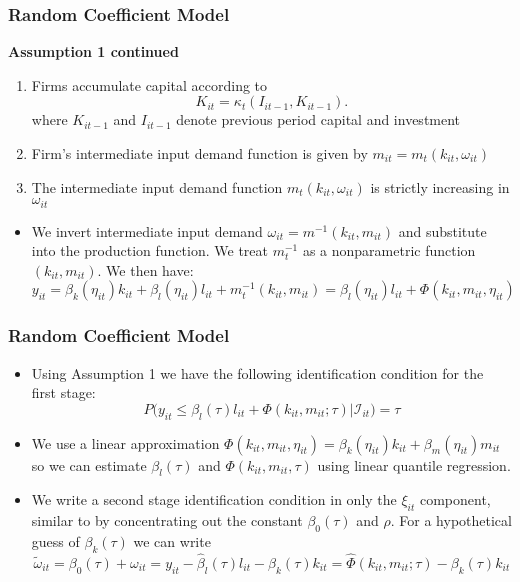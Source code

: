 \documentclass{beamer}
\begin{document}
\begin{frame}
\frametitle{Random Coefficient Model}
\textbf{Assumption 1 continued}
\begin{enumerate}
	\item Firms accumulate capital according to
	\begin{equation}
	    K_{it}=\kappa_{t}(I_{it-1}, K_{it-1}).
	\end{equation}
	where $K_{it-1}$ and $I_{it-1}$ denote previous period capital and investment
	\item Firm's intermediate input demand function is given by $m_{it}=m_{t}(k_{it}, \omega_{it})$
	\item The intermediate input demand function $m_{t}(k_{it}, \omega_{it})$ is strictly increasing in $\omega_{it}$
\end{enumerate}
\begin{itemize}
	\item We invert intermediate input demand $\omega_{it}=m^{-1}(k_{it}, m_{it})$ and substitute into the production function. We treat $m_{t}^{-1}$ as a nonparametric function $(k_{it}, m_{it})$. We then have:
	\begin{equation} \label{qpf1st}
		y_{it}=\beta_{k}(\eta_{it})k_{it}+\beta_{l}(\eta_{it})l_{it}+m_{t}^{-1}(k_{it}, m_{it})=\beta_{l}(\eta_{it})l_{it}+\Phi(k_{it}, m_{it}, \eta_{it})
	\end{equation}
\end{itemize}
\end{frame}


\begin{frame}
\frametitle{Random Coefficient Model}
\begin{itemize}
	\item Using Assumption 1 we have the following identification condition for the first stage:
		\begin{equation}
			P\big(y_{it}\leq \beta_{l}(\tau)l_{it}+\Phi(k_{it}, m_{it}; \tau)\big|\mathcal{I}_{it})=\tau
		\end{equation}
	\item We use a linear approximation $\Phi(k_{it}, m_{it}, \eta_{it})=\beta_{k}(\eta_{it})k_{it}+\beta_{m}(\eta_{it})m_{it}$ so we can estimate $\beta_{l}(\tau)$ and $\Phi(k_{it}, m_{it}, \tau)$ using linear quantile regression.
	\item We write a second stage identification condition in only the $\xi_{it}$ component, similar to \cite{Ackerberg2015} by concentrating out the constant $\beta_{0}(\tau)$ and $\rho$. For a hypothetical guess of $\beta_{k}(\tau)$ we can write
	\begin{equation}
		\tilde{\omega}_{it}=\beta_{0}(\tau)+\omega_{it}=y_{it}-\hat{\beta}_{l}(\tau)l_{it}-\beta_{k}(\tau)k_{it}=\hat{\Phi}(k_{it}, m_{it}; \tau)-\beta_{k}(\tau)k_{it}
\end{equation}
\end{itemize}
\end{frame}
\end{document}
